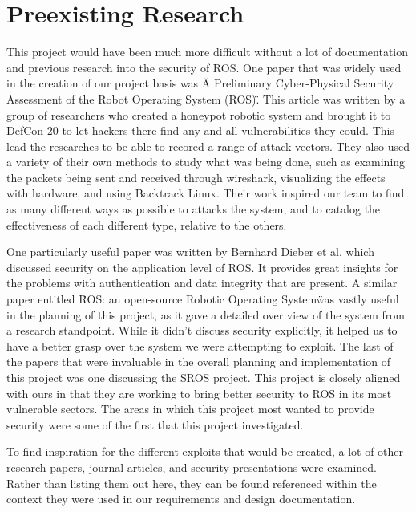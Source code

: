 \documentclass[IEEEtran,letterpaper,10pt,notitlepage,draftclsnofoot,onecolumn]{article}
\begin{document}
\section{Preexisting Research}
This project would have been much more difficult without a lot of documentation and previous research into the security of ROS.
One paper that was widely used in the creation of our project basis was \"A Preliminary Cyber-Physical Security Assessment of the Robot
Operating System (ROS)\". \cite{mainROS}
This article was written by a group of researchers who created a honeypot robotic system and brought it to DefCon 20 to let hackers there find any and all vulnerabilities they could.
This lead the researches to be able to recored a range of attack vectors.
They also used a variety of their own methods to study what was being done, such as examining the packets being sent and received through wireshark, visualizing the effects with hardware, and using Backtrack Linux.
Their work inspired our team to find as many different ways as possible to attacks the system, and to catalog the effectiveness of each different type, relative to the others.

One particularly useful paper was written by Bernhard Dieber et al, which discussed security on the application level of ROS.
It provides great insights for the problems with authentication and data integrity that are present. \cite{App}
A similar paper entitled \"ROS: an open-source Robotic Operating System\" was vastly useful in the planning of this project, as it gave a detailed over view of the system from a research standpoint.
While it didn't discuss security explicitly, it helped us to have a better grasp over the system we were attempting to exploit. \cite{Open}
The last of the papers that were invaluable in the overall planning and implementation of this project was one discussing the SROS project.
This project is closely aligned with ours in that they are working to bring better security to ROS in its most vulnerable sectors.
The areas in which this project most wanted to provide security were some of the first that this project investigated. \cite{Sros}

To find inspiration for the different exploits that would be created, a lot of other research papers, journal articles, and security presentations were examined.
Rather than listing them out here, they can be found referenced within the context they were used in our requirements and design documentation.
\end{document}

